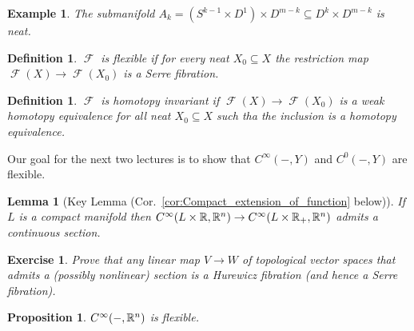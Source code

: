 \documentclass{article}
\newtheorem{proposition}[theorem]{Proposition}
\newtheorem{lemma}[theorem]{Lemma}
\newtheorem{definition}[theorem]{Definition}
\newtheorem{example}[theorem]{Example}
\newtheorem{exercise}[theorem]{Exercise}
\newtheorem{proposed work}[theorem]{Proposed Work}
\DeclareMathOperator{\CF}{\mathcal F}
\begin{document}
\begin{example}
  The submanifold $A_k = (S^{k-1}\times D^1) \times D^{m-k} \subseteq
  D^k\times D^{m-k}$ is neat.
\end{example}

\begin{definition} \label{def:flexible}
  $\CF$ is {\em flexible} if for every neat $X_0\subseteq X$ the
  restriction map $\CF(X)\to \CF(X_0)$ is a Serre fibration.
\end{definition}

\begin{definition} \label{def:htpyinvt}
  $\CF$ is {\em homotopy invariant} if $\CF(X) \to \CF(X_0)$ is a weak
  homotopy equivalence for all neat $X_0\subseteq X$ such tha the inclusion
  is a homotopy equivalence.
\end{definition}

Our goal for the next two lectures is to show that $C^\infty(-,Y)$ and
$C^0(-, Y)$ are flexible.

\begin{lemma}[Key Lemma (Cor.~\ref{cor:Compact_extension_of_function} below)] \label{lem:compactmapstoRn}
  If $L$ is a compact manifold then $C^\infty(L\times\mathbb R, \mathbb R^n) \to
  C^\infty(L\times \mathbb R_+, \mathbb R^n)$ admits a continuous section. 
\end{lemma}

\begin{exercise} \label{ex:vectorspacesection} Prove that any linear
  map $V\to W$ of topological vector spaces that admits a (possibly
  nonlinear) section is a Hurewicz fibration (and hence a Serre
  fibration).
\end{exercise}

\begin{proposition} \label{prop:mapstoRn}
  $C^\infty(-, \mathbb R^n)$ is flexible.
\end{proposition}
\end{document}
